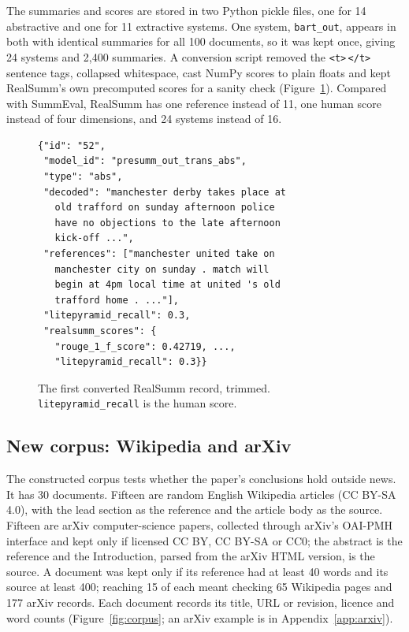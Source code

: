 \documentclass[11pt]{article}
\begin{document}
The summaries and scores are stored in two Python pickle files, one for 14 abstractive and one for 11 extractive systems. One system, \texttt{bart\_out}, appears in both with identical summaries for all 100 documents, so it was kept once, giving 24 systems and 2,400 summaries. A conversion script removed the \texttt{<t>}\,\texttt{</t>} sentence tags, collapsed whitespace, cast NumPy scores to plain floats and kept RealSumm's own precomputed scores for a sanity check (Figure~\ref{fig:realsumm}). Compared with SummEval, RealSumm has one reference instead of 11, one human score instead of four dimensions, and 24 systems instead of 16.

\begin{figure}[t]
\footnotesize
\begin{verbatim}
{"id": "52",
 "model_id": "presumm_out_trans_abs",
 "type": "abs",
 "decoded": "manchester derby takes place at
   old trafford on sunday afternoon police
   have no objections to the late afternoon
   kick-off ...",
 "references": ["manchester united take on
   manchester city on sunday . match will
   begin at 4pm local time at united 's old
   trafford home . ..."],
 "litepyramid_recall": 0.3,
 "realsumm_scores": {
   "rouge_1_f_score": 0.42719, ...,
   "litepyramid_recall": 0.3}}
\end{verbatim}
\caption{The first converted RealSumm record, trimmed. \texttt{litepyramid\_recall} is the human score.}
\label{fig:realsumm}
\end{figure}

\subsection{New corpus: Wikipedia and arXiv}
\label{sec:corpus}

The constructed corpus tests whether the paper's conclusions hold outside news. It has 30 documents. Fifteen are random English Wikipedia articles (CC BY-SA 4.0), with the lead section as the reference and the article body as the source. Fifteen are arXiv computer-science papers, collected through arXiv's OAI-PMH interface and kept only if licensed CC BY, CC BY-SA or CC0; the abstract is the reference and the Introduction, parsed from the arXiv HTML version, is the source. A document was kept only if its reference had at least 40 words and its source at least 400; reaching 15 of each meant checking 65 Wikipedia pages and 177 arXiv records. Each document records its title, URL or revision, licence and word counts (Figure~\ref{fig:corpus}; an arXiv example is in Appendix~\ref{app:arxiv}).
\end{document}
